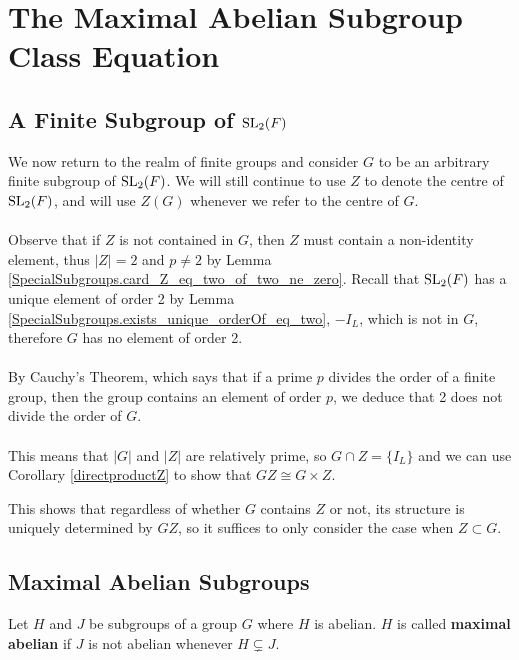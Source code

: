 \chapter[The Maximal Abelian Subgroup Class Equation]{The Maximal Abelian Subgroup Class Equation}\label{Ch6_MaximalAbelianSubgroupClassEquation}

\section[A finite subgroup of $\SL_2(F)$]{A Finite Subgroup of $\SL_2(F)$}

We now return to the realm of finite groups and consider $G$ to be an arbitrary finite subgroup of $\SL_2(F)$. We will still continue to use $Z$ to denote the centre of $\SL_2(F)$, and will use $Z(G)$ whenever we refer to the centre of $G$. \\
\\
Observe that if $Z$ is not contained in $G$, then $Z$ must contain a non-identity element, thus $|Z| = 2$ and $p \neq 2$ by Lemma \ref{SpecialSubgroups.card_Z_eq_two_of_two_ne_zero}. Recall that $\SL_2(F)$ has a unique element of order 2 by Lemma \ref{SpecialSubgroups.exists_unique_orderOf_eq_two}, $- I_L$, which is not in $G$, therefore $G$ has no element of order 2. \\
\\
By Cauchy's Theorem, which says that if a prime $p$ divides the order of a finite group, then the group contains an element of order $p$, we deduce that 2 does not divide the order of $G$. \\
\\
This means that $|G|$ and $|Z|$ are relatively prime, so $G \cap Z = \{ I_L \}$ and we can use Corollary \ref{directproductZ} to show that $GZ \cong G \times Z$. 

This shows that regardless of whether $G$ contains $Z$ or not, its structure is uniquely determined by $GZ$, so it suffices to only consider the case when $Z \subset G$. 

\section{Maximal Abelian Subgroups}

\begin{definition}
\label{IsMaximalAbelian}
\leanok
Let $H$ and $J$ be subgroups of a group $G$ where $H$ is abelian. $H$ is called \textbf{maximal abelian} if $J$ is not abelian whenever $H \subsetneq J$.
\end{definition}

